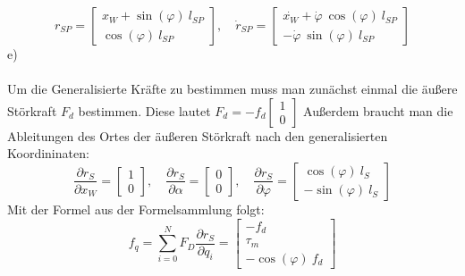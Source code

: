 \[r_{SP} = \begin{bmatrix} x_W + \sin{(\varphi)}\ l_{SP}  \\ \cos{(\varphi)}\ l_{SP}\end{bmatrix},\quad  \dot{r}_{SP}=\begin{bmatrix}
  \dot{x_W} + \dot{\varphi}\ \cos{(\varphi)}\ l_{SP}  \\ -\dot{\varphi}\ \sin{(\varphi)}\ l_{SP}
\end{bmatrix}\]
e) \\\\
\noindent
Um die Generalisierte Kräfte zu bestimmen muss man zunächst einmal die äußere Störkraft \(F_d\) bestimmen. Diese lautet \(F_d=-f_d \begin{bmatrix}
  1 \\ 0
\end{bmatrix}\) Außerdem braucht man die Ableitungen des Ortes der äußeren Störkraft nach den generalisierten Koordininaten:
\[ \frac{\partial r_S}{\partial x_W} = \begin{bmatrix}
  1 \\ 0
\end{bmatrix}, \quad \frac{\partial r_S}{\partial \alpha }  = \begin{bmatrix}
  0 \\ 0
\end{bmatrix}, \quad \frac{\partial r_S}{\partial \varphi} = \begin{bmatrix}
  \cos(\varphi)\ l_S \\ - \sin(\varphi)\ l_S
\end{bmatrix}\]
Mit der Formel aus der Formelsammlung folgt:
\[f_q = \sum_{i=0}^N F_D \frac{\partial r_S}{\partial q_i} = \begin{bmatrix}
  -f_d \\ \tau_m \\ -\cos(\varphi)\ f_d
\end{bmatrix}\]
